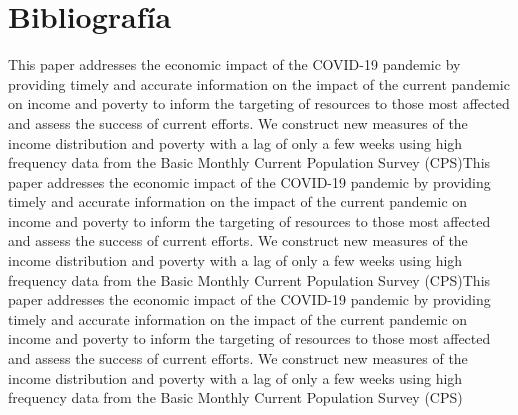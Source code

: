 \documentclass{article}
\begin{document}
\section{Bibliografía}
    This paper addresses the economic impact of the COVID-19 pandemic by providing timely and accurate information on the impact of the current pandemic on income and poverty to inform the targeting of resources to those most affected and assess the success of current efforts. We construct new measures of the income distribution and poverty with a lag of only a few weeks using high frequency data from the Basic Monthly Current Population Survey (CPS)This paper addresses the economic impact of the COVID-19 pandemic by providing timely and accurate information on the impact of the current pandemic on income and poverty to inform the targeting of resources to those most affected and assess the success of current efforts. We construct new measures of the income distribution and poverty with a lag of only a few weeks using high frequency data from the Basic Monthly Current Population Survey (CPS)This paper addresses the economic impact of the COVID-19 pandemic by providing timely and accurate information on the impact of the current pandemic on income and poverty to inform the targeting of resources to those most affected and assess the success of current efforts. We construct new measures of the income distribution and poverty with a lag of only a few weeks using high frequency data from the Basic Monthly Current Population Survey (CPS) \citep{Flores2005}
        
        
\end{document}
